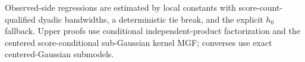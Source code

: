 Observed-side regressions are estimated by local constants with score-count-qualified dyadic bandwidths, a deterministic tie break, and the explicit \(h_0\) fallback. Upper proofs use conditional independent-product factorization and the centered score-conditional sub-Gaussian kernel MGF; converses use exact centered-Gaussian submodels.